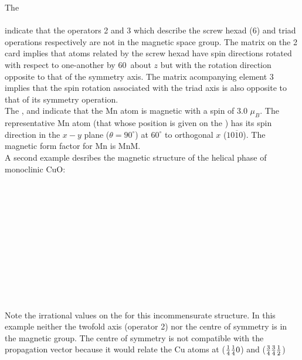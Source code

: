 \begin{varindent}{1 cm}
The \p
{}\\
\\
indicate that the operators 2 and 3 which describe the screw hexad 
(6) and triad operations respectively are not in the magnetic 
space group. The matrix on the  2 card implies that atoms 
related by the screw hexad have spin directions rotated with respect 
to one-another by 60\degrees\ about $z$ but with the rotation direction 
opposite to that of the symmetry axis. The matrix acompanying element 
3 implies that the spin rotation associated with the triad axis is
also opposite to that of its symmetry operation.\\[0.5ex]
The ,  and  indicate
that the Mn atom is magnetic with 
a spin of 3.0 $\mu_B$. The representative Mn atom (that whose position 
is given on the ) has its spin direction in the $x-y$ 
plane ($\theta=90^\circ$) at $60^\circ$ to orthogonal $x$ 
($10\overline10$). The magnetic form factor for Mn is MnM.
\\[0.5ex]
A second example desribes the magnetic structure of the helical 
phase of monoclinic CuO:\\
\\
\\
\\
\\
\\
\\
\\
\\
\\
\\
\\
\par 
Note the irrational values on the  for this incommensurate
structure. In this example neither the twofold axis (operator 2) nor the centre 
of symmetry is in the magnetic group.
The centre of symmetry is not compatible with the propagation vector because
it would relate the Cu atoms at (${1\over4} {1\over4} 0$) and (${3\over4} {3\over4} {1\over 2}$)

\end{varindent}
